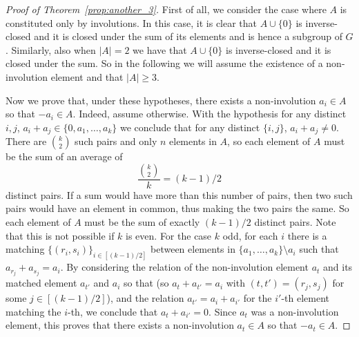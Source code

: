 \documentclass[10pt,a4paper]{amsart}
\begin{document}
\begin{proof}[Proof of Theorem~\ref{prop:another_3}]
First of all, we consider the case where $A$ is constituted only by involutions. In this case, it is clear that $A\cup \{0\}$ is inverse-closed and it is closed under the sum of its elements and is hence a subgroup of $G$. Similarly, also when $|A|=2$ we have that $A\cup \{0\}$ is inverse-closed and it is closed under the sum. So in the following we will assume the existence of a non-involution element and that $|A|\geq 3$.

Now we prove that, under these hypotheses, there exists a non-involution $a_i\in A$ so that $-a_i\in A$.
Indeed, assume otherwise. With the hypothesis for any distinct $i,j$, $a_i+a_j\in \{0,a_1,\ldots,a_k\}$ we conclude that for any distinct $\{i,j\}$, $a_i+a_j\not=0$. There are ${k \choose 2}$ such pairs and only $n$ elements in $A$, so each element of $A$ must be the sum of an average of  $$\frac{{k \choose 2}}{k}=(k-1)/2$$ distinct pairs.
If a sum would have more than this number of pairs, then two such pairs would have an element in common, thus making the two pairs the same. So each element of $A$ must be the sum of exactly $(k-1)/2$ distinct pairs. Note that this is not possible if $k$ is even. For the case $k$ odd, for each $i$ there is a matching $\{(r_i,s_i)\}_{i\in[(k-1)/2]}$ between elements in $\{a_1,\ldots,a_k\}\setminus a_i$ such that $a_{r_j}+a_{s_j}=a_i$. By considering the relation of the non-involution element $a_t$ and its matched element $a_{t'}$ and $a_i$ so that (so $a_t+a_{t'}=a_i$ with $(t,t')=(r_j,s_j)$ for some $j\in [(k-1)/2]$), and the relation $a_{t'}=a_i+a_{i'}$ for the $i'$-th element matching the $i$-th, we conclude that $a_t+a_{i'}=0$. Since $a_t$ was a non-involution element, this proves that there exists a non-involution $a_t\in A$ so that $-a_t\in A$. 




\end{proof}
\end{document}
